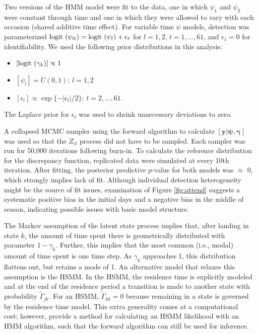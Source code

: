 \documentclass[12pt,english]{article}
\begin{document}
\begin{spacing}{1.9}
Two versions of the HMM model were fit to the data, one in which
$\psi_1$ and $\psi_2$ were constant through time and one in which they
were allowed to vary with each occasion (shared additive time
effect). For variable time $\psi$ models, detection was parameterized
${\rm logit}\ (\psi_{lt}) = \mbox{logit } (\psi_l) + \epsilon_t$ for
$l=1,2$, $t=1,\dots,61$, and $\epsilon_1 = 0$ for identifiability. We
used the following prior distributions in this analysis:
\begin{itemize}
\item $[{\rm logit}\ (\gamma_k)] \propto 1$
\item $[\psi_l] = U(0,1);\ l=1,2$
\item $[\epsilon_t] \propto \exp\{-|\epsilon_t|/2\};\ t=2,\dots,61$.
\end{itemize}
The Laplace prior for $\epsilon_t$ was used to shrink unnecessary
deviations to zero.

A collapsed MCMC sampler using the forward algorithm to calculate
$[\mathbf{y}|\boldsymbol{\psi},\boldsymbol{\gamma}]$ was used so that
the $Z_{it}$ process did not have to be sampled. Each sampler was run
for 50,000 iterations following burn-in. To calculate the reference
distribution for the discrepancy function, replicated data were
simulated at every 10th iteration. After fitting, the posterior
predictive $p$-value for both models was $\approx$ 0, which strongly
implies lack of fit.  Although individual detection heterogeneity
might be the source of fit issues, examination of Figure
\ref{fig:attend} suggests a systematic positive bias in the initial days
and a negative bias in the middle of season, indicating possible
issues with basic model structure.

The Markov assumption of the latent state process implies that, after
landing in state $k$, the amount of time spent there is geometrically
distributed with parameter $1-\gamma_k$. Further, this implies that
the most common (i.e., modal) amount of time spent is one time
step. As $\gamma_k$ approaches 1, this distribution flattens out, but
retains a mode of 1. An alternative model that relaxes this assumption
is the HSMM. In the HSMM, the residence time is explicitly modeled and
at the end of the residence period a transition is made to another
state with probability $\tilde\Gamma_{jk}$. For an HSMM,
$\tilde\Gamma_{kk} = 0$ because remaining in a state is governed by
the residence time model. This extra generality comes at a
computational cost; however, \citet{langrock2011hidden} provide a
method for calculating an HSMM likelihood with an HMM algorithm, such
that the forward algorithm can still be used for inference.


\end{spacing}
\end{document}
